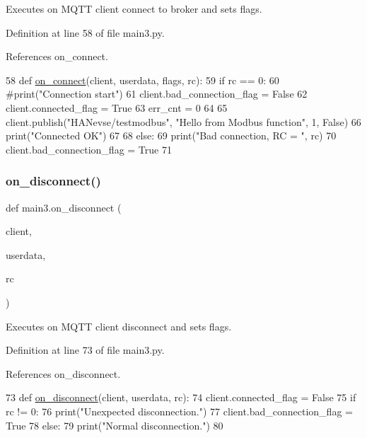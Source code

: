 Executes on M\+Q\+TT client connect to broker and sets flags. 



Definition at line 58 of file main3.\+py.



References on\+\_\+connect.


\begin{DoxyCode}
58 \textcolor{keyword}{def }\hyperlink{namespace_s_q_lfunction_a215e7090f82fbf0d31fd97be6721389a}{on\_connect}(client, userdata, flags, rc):
59     \textcolor{keywordflow}{if} rc == 0:
60         \textcolor{comment}{#print("Connection start")
}
61         client.bad\_connection\_flag = \textcolor{keyword}{False}
62         client.connected\_flag = \textcolor{keyword}{True}        
63         err\_cnt = 0
64 
65         client.publish(\textcolor{stringliteral}{"HANevse/testmodbus"}, \textcolor{stringliteral}{"Hello from Modbus function"}, 1, \textcolor{keyword}{False})
66         print(\textcolor{stringliteral}{"Connected OK"})       
67         
68     \textcolor{keywordflow}{else}:
69         print(\textcolor{stringliteral}{"Bad connection, RC = "}, rc)
70         client.bad\_connection\_flag = \textcolor{keyword}{True}
71 
\end{DoxyCode}
\mbox{\label{namespacemain3_a18d6f3292241050eec8b3891f834ad5d}} 
\subsubsection{\texorpdfstring{on\+\_\+disconnect()}{on\_disconnect()}}
{\footnotesize\ttfamily def main3.\+on\+\_\+disconnect (\begin{DoxyParamCaption}\item[{}]{client,  }\item[{}]{userdata,  }\item[{}]{rc }\end{DoxyParamCaption})}



Executes on M\+Q\+TT client disconnect and sets flags. 



Definition at line 73 of file main3.\+py.



References on\+\_\+disconnect.


\begin{DoxyCode}
73 \textcolor{keyword}{def }\hyperlink{namespace_s_q_lfunction_ab3031ccbbdb3f5a04bd7d66ceb4494c7}{on\_disconnect}(client, userdata, rc):
74     client.connected\_flag = \textcolor{keyword}{False}
75     \textcolor{keywordflow}{if} rc != 0:
76         print(\textcolor{stringliteral}{"Unexpected disconnection."})
77         client.bad\_connection\_flag = \textcolor{keyword}{True}
78     \textcolor{keywordflow}{else}:
79         print(\textcolor{stringliteral}{"Normal disconnection."})
80 
\end{DoxyCode}


